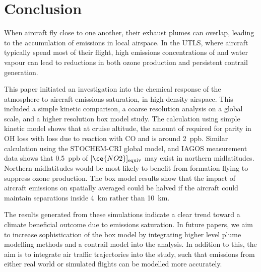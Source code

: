 \section{Conclusion}
When aircraft fly close to one another, their exhaust plumes can overlap, leading to the accumulation of emissions in local airspace. In the UTLS, where aircraft typically spend most of their flight, high emissions concentrations of  and water vapour can lead to reductions in both ozone production and persistent contrail generation.

This paper initiated an investigation into the chemical response of the atmosphere to aircraft emissions saturation, in high-density airspace. This included a simple kinetic comparison, a coarse resolution analysis on a global scale, and a higher resolution box model study. The calculation using simple kinetic model shows that at cruise altitude, the amount of  required for parity in OH loss with loss due to reaction with CO and  is around 2~ppb. Similar calculation using the STOCHEM-CRI global model, and IAGOS measurement data shows that 0.5~ppb of ${[\ce{NO2}]_{\mathrm{equiv}}}$ may exist in northern midlatitudes. Northern midlatitudes would be most likely to benefit from formation flying to suppress ozone production. The box model results show that the impact of aircraft emissions on spatially averaged  could be halved if the aircraft could maintain separations inside 4~km rather than 10~km.

The results generated from these simulations indicate a clear trend toward a climate beneficial outcome due to emissions saturation. In future papers, we aim to increase sophistication of the box model by integrating higher level plume modelling methods and a contrail model into the analysis. In addition to this, the aim is to integrate air traffic trajectories into the study, such that emissions from either real world or simulated flights can be modelled more accurately.